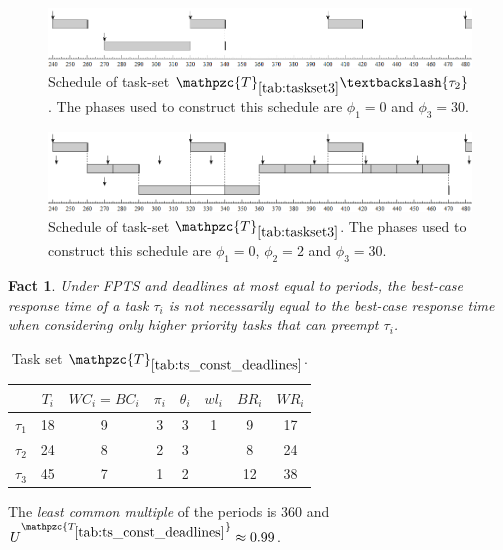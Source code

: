 \documentclass[fleqn]{article}
\newtheorem{fact}{Fact}
\begin{document}
\begin{figure}[H]
	\centering
	\includegraphics[width=0.9\linewidth]{figures/fact6_1}
	\caption{Schedule of task-set $\mathpzc{T}_{\ref{tab:taskset3}} \textbackslash \{\tau_2\}$. The phases used to construct this schedule are $\phi_1 = 0$ and $\phi_3 = 30$.}
	\label{fig:fact6_1}
\end{figure}

\begin{figure}[H]
	\centering
	\includegraphics[width=0.9\linewidth]{figures/fact6_2}
	\caption{Schedule of task-set $\mathpzc{T}_{\ref{tab:taskset3}}$. The phases used to construct this schedule are $\phi_1 = 0$, $\phi_2 = 2$ and $\phi_3 = 30$.}
	\label{fig:fact6_2}
\end{figure}

\begin{fact}
	Under FPTS and deadlines at most equal to periods, the best-case response time of a task $\tau_i$ is not necessarily equal to the best-case response time when considering only higher priority tasks that can preempt $\tau_i$.
\end{fact}

\begin{table}[H]
	\center
	\caption{Task set $\mathpzc{T}_{\ref{tab:ts_const_deadlines}}$.}
	\label{tab:ts_const_deadlines}
	\begin{tabular}{c c c c c | c c c }
		\hline 
		& $T_i$ & $WC_i=BC_i$ & $\pi_i$ & $\theta_i$ &  $wl_i$ & $BR_i$ & $WR_i$\\ 
		\hline 
		$\tau_1$& 18  & 9  & 3 & 3 &  1 & 9  & 17 \\ 
		$\tau_2$& 24  & 8  & 2 & 3 &    & 8  & 24 \\ 
		$\tau_3$& 45  & 7  & 1 & 2 &    & 12 & 38 \\ 
		\hline 
	\end{tabular}
	
	\small
	\item The \textit{least common multiple} of the periods is 360 and $U^{\mathpzc{T_{\ref{tab:ts_const_deadlines}}}} \approx 0.99$.
\end{table} 
\end{document}
